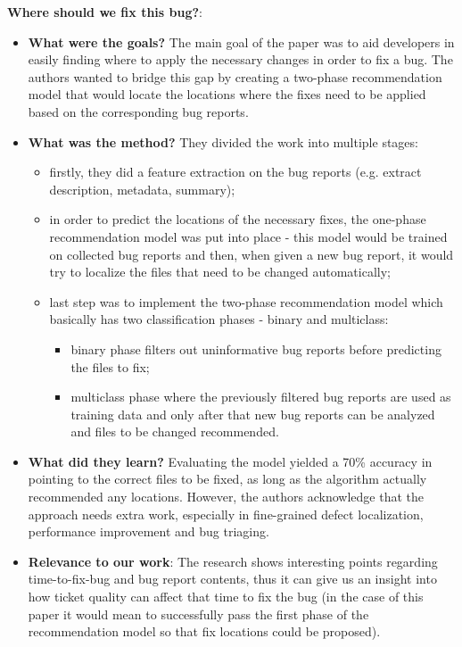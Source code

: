 \documentclass{mprop}
\begin{document}
\textbf{Where should we fix this bug?}\cite{kim2013should}:
\begin{itemize}
  \item \textbf{What were the goals?}
    The main goal of the paper was to aid developers in easily finding where to
    apply the necessary changes in order to fix a bug. The authors wanted to bridge
    this gap by creating a two-phase recommendation model that would locate the locations
    where the fixes need to be applied based on the corresponding bug reports.
  \item \textbf{What was the method?}
    They divided the work into multiple stages:
      \begin{itemize}
        \item firstly, they did a feature extraction on the bug reports (e.g. extract
        description, metadata, summary);
        \item in order to predict the locations of the necessary fixes, the one-phase
        recommendation model was put into place - this model would be trained on collected
        bug reports and then, when given a new bug report, it would try to localize the 
        files that need to be changed automatically;
        \item last step was to implement the two-phase recommendation model which basically
        has two classification phases - binary and multiclass:
          \begin{itemize}
            \item binary phase filters out uninformative bug reports before predicting the
            files to fix;
            \item multiclass phase where the previously filtered bug reports are used as
            training data and only after that new bug reports can be analyzed and files to be
            changed recommended.
          \end{itemize}
      \end{itemize}
  \item \textbf{What did they learn?}
    Evaluating the model yielded a 70\% accuracy in pointing to the correct files
    to be fixed, as long as the algorithm actually recommended any locations. However, the authors
    acknowledge that the approach needs extra work, especially in fine-grained defect 
    localization, performance improvement and bug triaging.
  \item \textbf{Relevance to our work}:
    The research shows interesting points regarding time-to-fix-bug and bug report
    contents, thus it can give us an insight into how ticket quality can affect that 
    time to fix the bug (in the case of this paper it would mean to successfully pass the first
    phase of the recommendation model so that fix locations could be proposed).
\end{itemize}
\end{document}
